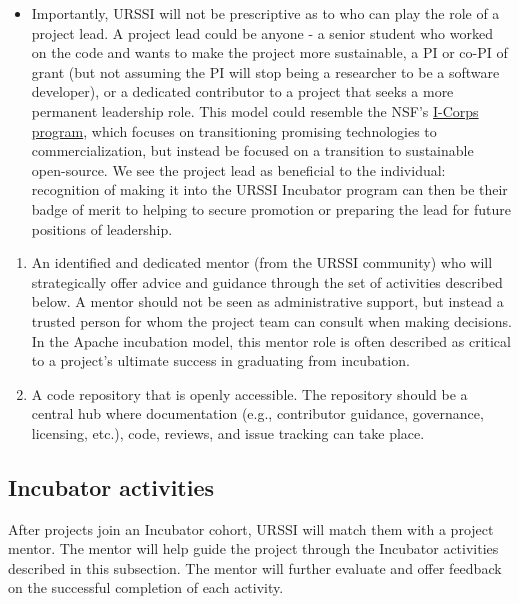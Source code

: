 \documentclass[
]{book}
\providecommand{\tightlist}{%
  \setlength{\itemsep}{0pt}\setlength{\parskip}{0pt}}
\begin{document}
\begin{itemize}
\tightlist
\item
  Importantly, URSSI will not be prescriptive as to who can play the role of a project lead.
  A project lead could be anyone - a senior student who worked on the code and wants to make the project more sustainable, a PI or co-PI of grant (but not assuming the PI will stop being a researcher to be a software developer), or a dedicated contributor to a project that seeks a more permanent leadership role.
  This model could resemble the NSF's \href{https://www.nsf.gov/news/special_reports/i-corps/}{I-Corps program}, which focuses on transitioning promising technologies to commercialization, but instead be focused on a transition to sustainable open-source.
  We see the project lead as beneficial to the individual: recognition of making it into the URSSI Incubator program can then be their badge of merit to helping to secure promotion or preparing the lead for future positions of leadership.
\end{itemize}

\begin{enumerate}
\def\labelenumi{\arabic{enumi}.}
\setcounter{enumi}{1}
\item
  An identified and dedicated mentor (from the URSSI community) who will strategically offer advice and guidance through the set of activities described below.
  A mentor should not be seen as administrative support, but instead a trusted person for whom the project team can consult when making decisions.
  In the Apache incubation model, this mentor role is often described as critical to a project's ultimate success in graduating from incubation.
\item
  A code repository that is openly accessible.
  The repository should be a central hub where documentation (e.g., contributor guidance, governance, licensing, etc.), code, reviews, and issue tracking can take place.
\end{enumerate}

\hypertarget{incubator-activities}{%
\subsection{Incubator activities}\label{incubator-activities}}

After projects join an Incubator cohort, URSSI will match them with a project mentor.
The mentor will help guide the project through the Incubator activities described in this subsection.
The mentor will further evaluate and offer feedback on the successful completion of each activity.
\end{document}
